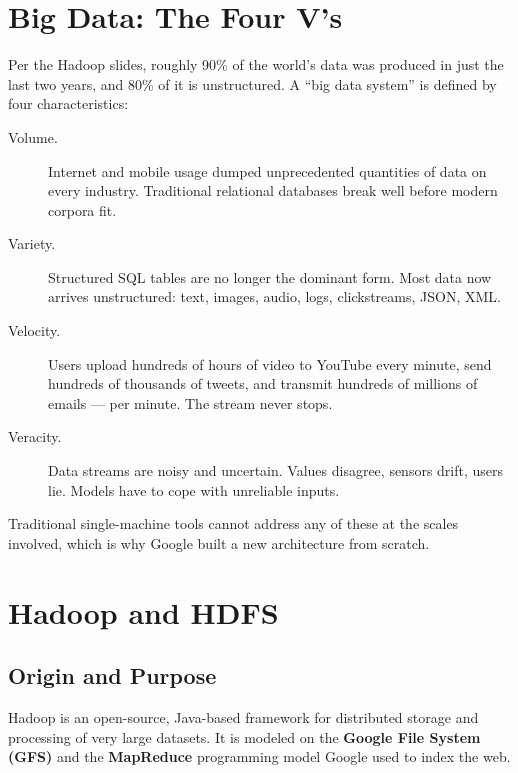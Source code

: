 \documentclass[11pt]{article}
\begin{document}
\section{Big Data: The Four V's}

Per the Hadoop slides, roughly 90\% of the world's data was produced in just the last two years, and 80\% of it is unstructured. A ``big data system'' is defined by four characteristics:

\begin{description}
    \item[Volume.] Internet and mobile usage dumped unprecedented quantities of data on every industry. Traditional relational databases break well before modern corpora fit.
    \item[Variety.] Structured SQL tables are no longer the dominant form. Most data now arrives unstructured: text, images, audio, logs, clickstreams, JSON, XML.
    \item[Velocity.] Users upload hundreds of hours of video to YouTube every minute, send hundreds of thousands of tweets, and transmit hundreds of millions of emails --- per minute. The stream never stops.
    \item[Veracity.] Data streams are noisy and uncertain. Values disagree, sensors drift, users lie. Models have to cope with unreliable inputs.
\end{description}

Traditional single-machine tools cannot address any of these at the scales involved, which is why Google built a new architecture from scratch.


\section{Hadoop and HDFS}

\subsection{Origin and Purpose}
Hadoop is an open-source, Java-based framework for distributed storage and processing of very large datasets. It is modeled on the \textbf{Google File System (GFS)} and the \textbf{MapReduce} programming model Google used to index the web.
\end{document}
